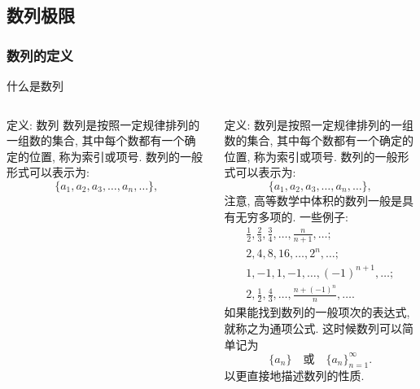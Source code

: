 \documentclass[
10pt, 
aspectratio=43, 
]{beamer}
\begin{document}
\subsection{数列极限}
\subsubsection{数列的定义}
\begin{frame}{什么是数列}
\begin{columns}
         \begin{block}{定义: 数列}
        数列是按照一定规律排列的一组数的集合, 其中每个数都有一个确定的位置, 称为索引或项号. 数列的一般形式可以表示为: 
        \begin{equation*}
            \{ a_1,  a_2,  a_3,  \ldots,  a_n,  \ldots \}, 
        \end{equation*}
         \end{block}
        定义: 数列是按照一定规律排列的一组数的集合, 其中每个数都有一个确定的位置, 称为索引或项号. 数列的一般形式可以表示为: 
        \begin{equation*}
            \{ a_1,  a_2,  a_3,  \ldots,  a_n,  \ldots \}, 
        \end{equation*}
        注意, 高等数学中体积的数列一般是具有无穷多项的. 
	\small
        一些例子: 
        \begin{equation*}
        \begin{array}{l}
        {\displaystyle\frac12, \frac23, \frac34, \ldots, \frac{n}{n+1}, \ldots;}\\
        {\displaystyle2, 4, 8, 16, \ldots, 2^n, \ldots;}\\
        {\displaystyle1, -1, 1, -1, \ldots, (-1)^{n+1}, \ldots;}\\
        {\displaystyle2, \frac12, \frac43, \ldots, \frac{n+(-1)^n}{n}, \ldots.}
        \end{array}
        \end{equation*}
        如果能找到数列的一般项次的表达式, 就称之为通项公式. 这时候数列可以简单记为
        \begin{equation*}
        \{a_n\}\quad \text{或}\quad \{a_n\}_{n=1}^\infty.
        \end{equation*}
        以更直接地描述数列的性质. 
\end{columns}
\end{frame}
\end{document}
